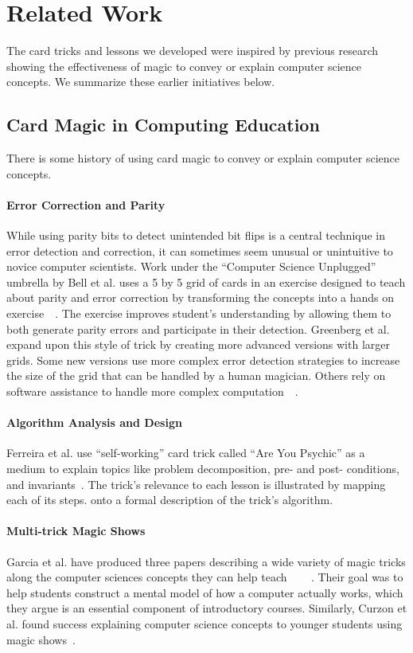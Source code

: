 \section{Related Work}
\label{SEC:related-work}

The card tricks and lessons we developed were inspired by previous research
showing the effectiveness of magic to convey or explain computer science
concepts.  We summarize these earlier initiatives below.

\subsection{Card Magic in Computing Education}
There is some history of using card magic to convey or explain computer science
concepts.

\paragraph{Error Correction and Parity}
While using parity bits to detect unintended bit flips is a central technique
in error detection and correction, it can sometimes seem unusual or unintuitive
to novice computer scientists.
Work under the ``Computer Science Unplugged'' umbrella by Bell et al. uses
a 5 by 5 grid of cards in an exercise designed to teach about parity and
error correction by transforming the concepts into a hands on
exercise~\cite{bell2009computer}~\cite{csunplugged}.  The exercise improves
student's understanding by allowing them to both generate parity errors and
participate in their detection.
Greenberg et al. expand upon this style of trick by creating more advanced
versions with larger grids.  Some new versions use more complex error detection
strategies to increase the size of the grid that can be handled by a human
magician.  Others rely on software assistance to handle more complex
computation~\cite{Greenberg2017}~\cite{Greenberg2018}.

\paragraph{Algorithm Analysis and Design}
Ferreira et al. use ``self-working'' card trick called ``Are You Psychic''
as a medium to explain topics
like problem decomposition, pre- and post- conditions, and
invariants~\cite{ferreira2014magic}.
The trick's relevance to each lesson is illustrated by
mapping each of its steps.
onto a formal description of the trick's algorithm.

\paragraph{Multi-trick Magic Shows}
Garcia et al. have produced three papers describing a wide variety of magic
tricks along the computer sciences concepts they can help
teach~\cite{garcia2012demystifying}
~\cite{garcia2013demystifying}
~\cite{garcia2016demystifying}.
Their goal was to help students construct a mental model of how a computer
actually works, which they argue is an essential component of introductory
courses.
Similarly, Curzon et al. found success explaining computer
science concepts to younger students using magic shows~\cite{Curzon2008}.

